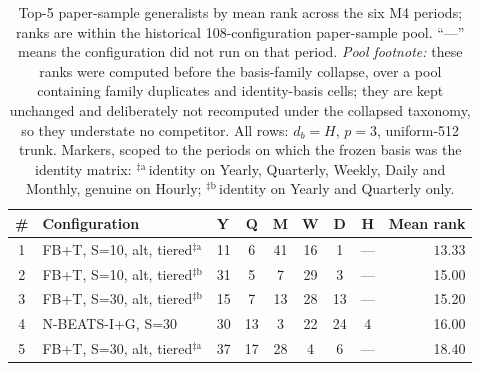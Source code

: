
\begin{table}[h]
  \centering
  \scriptsize
  \setlength{\tabcolsep}{3pt}
  \caption{Top-5 paper-sample generalists by mean rank across the six M4
  periods; ranks are within the historical 108-configuration paper-sample
  pool. ``---'' means the configuration did not run on that period.
  \emph{Pool footnote:} these ranks were computed before the basis-family
  collapse, over a pool containing family duplicates and identity-basis
  cells; they are kept unchanged and deliberately not recomputed under the
  collapsed taxonomy, so they understate no competitor. All rows: $d_b =
  H$, $p = 3$, uniform-512 trunk. Markers, scoped to the periods on which
  the frozen basis was the identity matrix:
  $^{\ddag\mathrm{a}}$\,identity on Yearly, Quarterly, Weekly, Daily and
  Monthly, genuine on Hourly;
  $^{\ddag\mathrm{b}}$\,identity on Yearly and Quarterly only.}
  \label{tab:generalist_paper}
  \begin{tabular}{@{}cllcccccr@{}}
    \toprule
    \# & Configuration & Y & Q & M & W & D & H & Mean rank \\
    \midrule
    1 & FB+T, S=10, alt, tiered$^{\ddag\mathrm{a}}$ & 11 & 6  & 41 & 16 & 1  & --- & $\mathbf{13.33}$ \\
    2 & FB+T, S=10, alt, tiered$^{\ddag\mathrm{b}}$ & 31 & 5  & 7  & 29 & 3  & --- & 15.00 \\
    3 & FB+T, S=30, alt, tiered$^{\ddag\mathrm{b}}$ & 15 & 7  & 13 & 28 & 13 & --- & 15.20 \\
    4 & N-BEATS-I+G, S=30                           & 30 & 13 & 3  & 22 & 24 & 4   & 16.00 \\
    5 & FB+T, S=30, alt, tiered$^{\ddag\mathrm{a}}$ & 37 & 17 & 28 & 4  & 6  & --- & 18.40 \\
    \bottomrule
  \end{tabular}
\end{table}